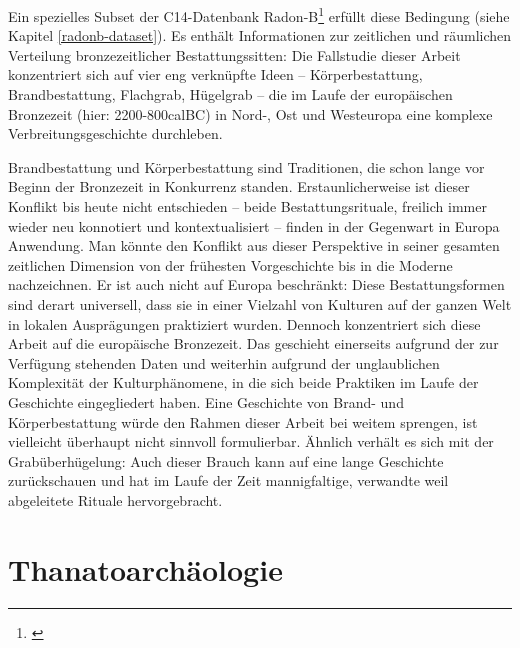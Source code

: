 \documentclass[openany,twoside,twocolumn]{book}
\let\rmarkdownfootnote\footnote%
\def\footnote{\protect\rmarkdownfootnote}
\begin{document}
Ein spezielles Subset der C14-Datenbank Radon-B\footnote{\textcite{jutta_kneisel_radon-b_2013}}
erfüllt diese Bedingung (siehe Kapitel \ref{radonb-dataset}). Es enthält
Informationen zur zeitlichen und räumlichen Verteilung bronzezeitlicher
Bestattungssitten: Die Fallstudie dieser Arbeit konzentriert sich auf
vier eng verknüpfte Ideen -- Körperbestattung, Brandbestattung,
Flachgrab, Hügelgrab -- die im Laufe der europäischen Bronzezeit (hier:
2200-800calBC) in Nord-, Ost und Westeuropa eine komplexe
Verbreitungsgeschichte durchleben.

Brandbestattung und Körperbestattung sind Traditionen, die schon lange
vor Beginn der Bronzezeit in Konkurrenz standen. Erstaunlicherweise ist
dieser Konflikt bis heute nicht entschieden -- beide Bestattungsrituale,
freilich immer wieder neu konnotiert und kontextualisiert -- finden in
der Gegenwart in Europa Anwendung. Man könnte den Konflikt aus dieser
Perspektive in seiner gesamten zeitlichen Dimension von der frühesten
Vorgeschichte bis in die Moderne nachzeichnen. Er ist auch nicht auf
Europa beschränkt: Diese Bestattungsformen sind derart universell, dass
sie in einer Vielzahl von Kulturen auf der ganzen Welt in lokalen
Ausprägungen praktiziert wurden. Dennoch konzentriert sich diese Arbeit
auf die europäische Bronzezeit. Das geschieht einerseits aufgrund der
zur Verfügung stehenden Daten und weiterhin aufgrund der unglaublichen
Komplexität der Kulturphänomene, in die sich beide Praktiken im Laufe
der Geschichte eingegliedert haben. Eine Geschichte von Brand- und
Körperbestattung würde den Rahmen dieser Arbeit bei weitem sprengen, ist
vielleicht überhaupt nicht sinnvoll formulierbar. Ähnlich verhält es
sich mit der Grabüberhügelung: Auch dieser Brauch kann auf eine lange
Geschichte zurückschauen und hat im Laufe der Zeit mannigfaltige,
verwandte weil abgeleitete Rituale hervorgebracht.

\hypertarget{thanatoarchaologie}{%
\section{Thanatoarchäologie}\label{thanatoarchaologie}}
\end{document}
